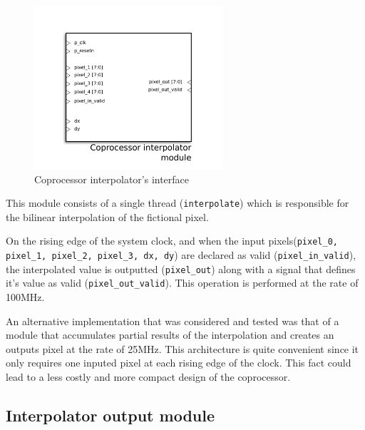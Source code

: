 \begin{figure}[H]
\center
\includegraphics[width=7cm]{figs/INTERPOLATOR.pdf}
\caption{Coprocessor interpolator's interface}
\label{interpo_ports}
\end{figure}



This module consists of a single thread (\texttt{interpolate}) which is responsible for the bilinear interpolation of the fictional pixel. 

On the rising edge of the system clock, and when the input pixels(\texttt{pixel\_0, pixel\_1, pixel\_2, pixel\_3, dx, dy}) are declared as valid (\texttt{pixel\_in\_valid}), the interpolated value is outputted (\texttt{pixel\_out}) along with a signal that defines it's value as valid (\texttt{pixel\_out\_valid}). 
This operation is performed at the rate of 100MHz.  


An alternative implementation that was considered and tested was that of a module that accumulates partial results of the interpolation and creates an outputs pixel at the rate of 25MHz. This architecture is quite convenient since it only requires one inputed pixel at each rising edge of the clock. This fact could lead to a less costly and more compact design of the coprocessor.  

\subsection{Interpolator output module}

